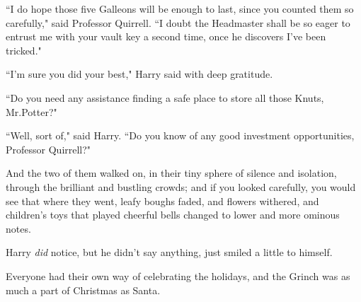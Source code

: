 ``I do hope those five Galleons will be enough to last, since you counted them so carefully," said Professor Quirrell. ``I doubt the Headmaster shall be so eager to entrust me with your vault key a second time, once he discovers I've been tricked."

``I'm sure you did your best," Harry said with deep gratitude.

``Do you need any assistance finding a safe place to store all those Knuts, Mr.\?Potter?"

``Well, sort of," said Harry. ``Do you know of any good investment opportunities, Professor Quirrell?"

And the two of them walked on, in their tiny sphere of silence and isolation, through the brilliant and bustling crowds; and if you looked carefully, you would see that where they went, leafy boughs faded, and flowers withered, and children's toys that played cheerful bells changed to lower and more ominous notes.

Harry \emph{did} notice, but he didn't say anything, just smiled a little to himself.

Everyone had their own way of celebrating the holidays, and the Grinch was as much a part of Christmas as Santa.

